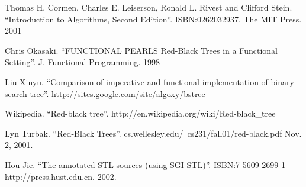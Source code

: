 \documentclass{article}
\begin{document}
\begin{thebibliography}{99}

Thomas H. Cormen, Charles E. Leiserson, Ronald L. Rivest and Clifford Stein. 
``Introduction to Algorithms, Second Edition''. ISBN:0262032937. The MIT Press. 2001

Chris Okasaki. ``FUNCTIONAL PEARLS Red-Black Trees in a Functional Setting''. J. Functional Programming. 1998

Liu Xinyu. ``Comparison of imperative and functional implementation of binary search tree''. http://sites.google.com/site/algoxy/bstree

Wikipedia. ``Red-black tree''. http://en.wikipedia.org/wiki/Red-black\_tree

Lyn Turbak. ``Red-Black Trees''. cs.wellesley.edu/~cs231/fall01/red-black.pdf Nov. 2, 2001.

Hou Jie. ``The annotated STL sources (using SGI STL)''. ISBN:7-5609-2699-1 http://press.hust.edu.cn. 2002.

\end{thebibliography}

\ifx\wholebook\relax\else
\end{document}
